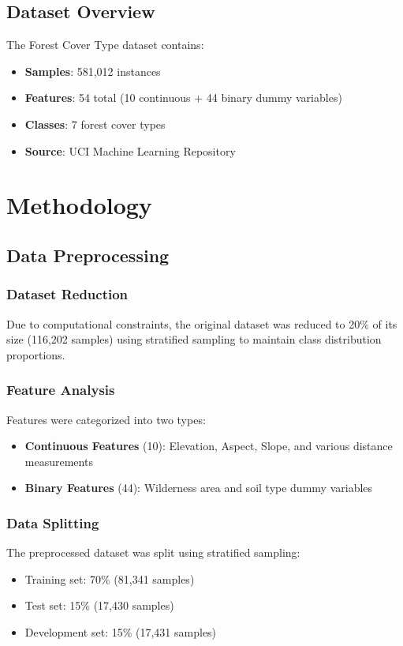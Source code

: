 \documentclass[12pt,a4paper]{article}
\begin{document}
\subsection{Dataset Overview}
The Forest Cover Type dataset contains:
\begin{itemize}
    \item \textbf{Samples}: 581,012 instances
    \item \textbf{Features}: 54 total (10 continuous + 44 binary dummy variables)
    \item \textbf{Classes}: 7 forest cover types
    \item \textbf{Source}: UCI Machine Learning Repository
\end{itemize}

\section{Methodology}

\subsection{Data Preprocessing}

\subsubsection{Dataset Reduction}
Due to computational constraints, the original dataset was reduced to 20\% of its size (116,202 samples) using stratified sampling to maintain class distribution proportions.

\subsubsection{Feature Analysis}
Features were categorized into two types:
\begin{itemize}
    \item \textbf{Continuous Features} (10): Elevation, Aspect, Slope, and various distance measurements
    \item \textbf{Binary Features} (44): Wilderness area and soil type dummy variables
\end{itemize}

\subsubsection{Data Splitting}
The preprocessed dataset was split using stratified sampling:
\begin{itemize}
    \item Training set: 70\% (81,341 samples)
    \item Test set: 15\% (17,430 samples)
    \item Development set: 15\% (17,431 samples)
\end{itemize}
\end{document}

